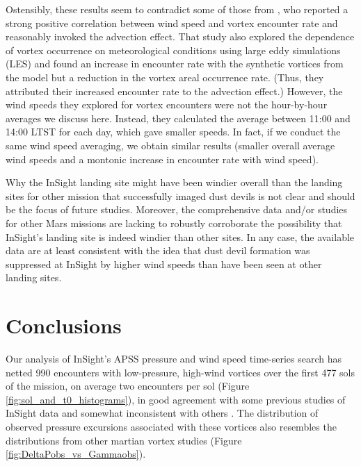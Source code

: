 \documentclass[linenumbers,trackchanges]{aastex63}
\begin{document}
{Ostensibly, these results seem to contradict some of those from \cite{2021JGRE..12606511S}, who reported a strong positive correlation between wind speed and vortex encounter rate and reasonably invoked the advection effect. That study also explored the dependence of vortex occurrence on meteorological conditions using large eddy simulations (LES) and found an increase in encounter rate with the synthetic vortices from the model but a reduction in the vortex areal occurrence rate. (Thus, they attributed their increased encounter rate to the advection effect.)
However, the wind speeds they explored for vortex encounters were not the hour-by-hour averages we discuss here. Instead, they calculated the average between 11:00 and 14:00 LTST for each day, which gave smaller speeds. In fact, if we conduct the same wind speed averaging, we obtain similar results (smaller overall average wind speeds and a montonic increase in encounter rate with wind speed). 

Why the InSight landing site might have been windier overall than the landing sites for other mission that successfully imaged dust devils is not clear and should be the focus of future studies. Moreover, the comprehensive data and/or studies for other Mars missions are lacking to robustly corroborate the possibility that InSight's landing site is indeed windier than other sites. In any case, the available data are at least consistent with the idea that dust devil formation was suppressed at InSight by higher wind speeds than have been seen at other landing sites. 


}

\section{Conclusions}
\label{sec:Conclusions}

Our analysis of InSight's APSS pressure and wind speed time-series search has netted 990 encounters with low-pressure, high-wind vortices over the first 477 sols of the mission, on average two encounters per sol (Figure \ref{fig:sol_and_t0_histograms}), in good agreement with some previous studies of InSight data \citep{2021Icar..35514119L} and somewhat inconsistent with others \citep{2021JGRE..12606511S}. The distribution of observed pressure excursions associated with these vortices also resembles the distributions from other martian vortex studies (Figure \ref{fig:DeltaPobs_vs_Gammaobs}). 
\end{document}
